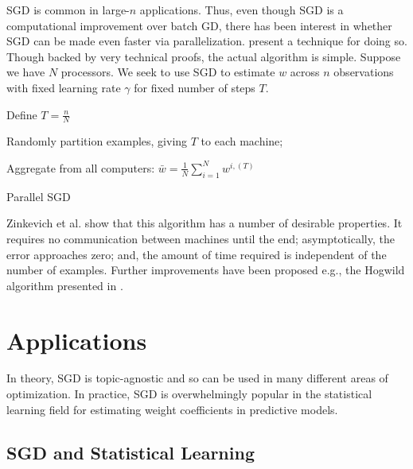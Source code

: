 \documentclass{article}
\begin{document}
SGD is common in large-$n$ applications. Thus,
even though SGD is a computational improvement over batch GD, there has been
interest in whether SGD can be made even faster via parallelization.
\cite{zinkevich2010parallelized} present a technique for doing so. Though backed
by very technical proofs, the actual algorithm is simple. Suppose we have $N$ processors. We seek to
use SGD to estimate $w$ across $n$ observations with fixed learning rate
$\gamma$ for fixed number of steps $T$.

\medskip

\begin{algorithm}[H]
	Define $T = \frac{n}{N}$\;

	Randomly partition examples, giving $T$ to each machine;\

	Aggregate from all computers: $\bar{w} = \frac{1}{N} \sum_{i=1}^{N}
	w^{i, (T)}$ \;


	\caption{Parallel SGD}
\end{algorithm}

\medskip

Zinkevich et al. show that this algorithm has a number of desirable properties.
It requires no communication between machines until the end; asymptotically, the
error approaches zero; and, the amount of time required is independent of the number of
examples. Further improvements have been proposed e.g., the Hogwild algorithm
presented in \cite{recht2011hogwild}.

\section{Applications}

In theory, SGD is topic-agnostic and so can be used in many different areas of optimization. In
practice, SGD is overwhelmingly popular in the statistical learning
field for estimating weight coefficients in predictive models. 

\subsection{SGD and Statistical Learning}
\end{document}
